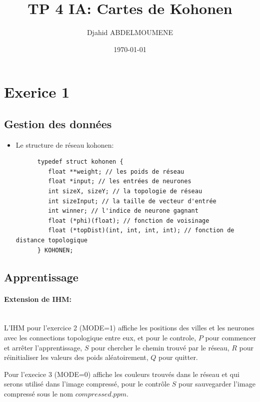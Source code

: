 \documentclass{article}
\title{TP 4 IA: Cartes de Kohonen}
\date{\today}
\author{Djahid ABDELMOUMENE}
\begin{document}
\maketitle

\section{Exerice 1}
\subsection{Gestion des données}
\begin{itemize}
   \item
      Le structure de réseau kohonen:
      \begin{lstlisting}
      typedef struct kohonen {
         float **weight; // les poids de réseau
         float *input; // les entrées de neurones
         int sizeX, sizeY; // la topologie de réseau
         int sizeInput; // la taille de vecteur d'entrée
         int winner; // l'indice de neurone gagnant
         float (*phi)(float); // fonction de voisinage
         float (*topDist)(int, int, int, int); // fonction de distance topologique
      } KOHONEN;
      \end{lstlisting}

\end{itemize}

\subsection{Apprentissage}
\paragraph{Extension de IHM:}\\
   L'IHM pour l'exercice 2 (MODE=1) affiche les positions des villes et
les neurones avec les connections topologique entre eux, et pour le
controle, $P$ pour commencer et arrêter l'apprentissage, $S$ pour
chercher le chemin trouvé par le réseau, $R$ pour réinitialiser les
valeurs des poids aléatoirement, $Q$ pour quitter.\\
\vspace{2mm}

Pour l'execice 3 (MODE=0) affiche les couleurs trouvés dans le réseau
et qui serons utilisé dans l'image compressé, pour le contrôle $S$ pour
sauvegarder l'image compressé sous le nom $compressed.ppm$.\\
\end{document}
